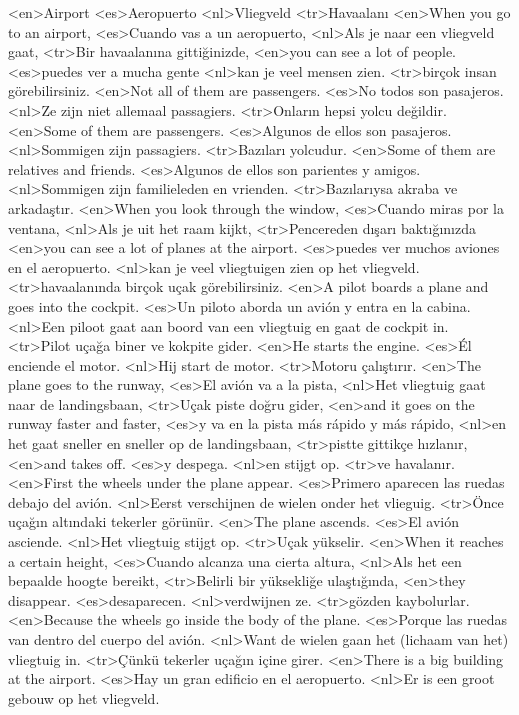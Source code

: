 <en>Airport
<es>Aeropuerto
<nl>Vliegveld 
<tr>Havaalanı
<en>When you go to an airport,
<es>Cuando vas a un aeropuerto,
<nl>Als je naar een vliegveld gaat,
<tr>Bir havaalanına gittiğinizde,
<en>you can see a lot of people.
<es>puedes ver a mucha gente
<nl>kan je veel mensen zien.
<tr>birçok insan görebilirsiniz.
<en>Not all of them are passengers.
<es>No todos son pasajeros.
<nl>Ze zijn niet allemaal passagiers.
<tr>Onların hepsi yolcu değildir.
<en>Some of them are passengers.
<es>Algunos de ellos son pasajeros.
<nl>Sommigen zijn passagiers.
<tr>Bazıları yolcudur.
<en>Some of them are relatives and friends.
<es>Algunos de ellos son parientes y amigos.
<nl>Sommigen zijn familieleden en vrienden.
<tr>Bazılarıysa akraba ve arkadaştır.
<en>When you look through the window,
<es>Cuando miras por la ventana,
<nl>Als je uit het raam kijkt, 
<tr>Pencereden dışarı baktığınızda
<en>you can see a lot of planes at the airport.
<es>puedes ver muchos aviones en el aeropuerto.
<nl>kan je veel vliegtuigen zien op het vliegveld.
<tr>havaalanında birçok uçak görebilirsiniz.
<en>A pilot boards a plane and goes into the cockpit.
<es>Un piloto aborda un avión y entra en la cabina.
<nl>Een piloot gaat aan boord van een vliegtuig en gaat de cockpit in.
<tr>Pilot uçağa biner ve kokpite gider.
<en>He starts the engine.
<es>Él enciende el motor.
<nl>Hij start de motor.
<tr>Motoru çalıştırır.
<en>The plane goes to the runway,
<es>El avión va a la pista,
<nl>Het vliegtuig gaat naar de landingsbaan,
<tr>Uçak piste doğru gider, 
<en>and it goes on the runway faster and faster,
<es>y va en la pista más rápido y más rápido,
<nl>en het gaat sneller en sneller op de landingsbaan,
<tr>pistte gittikçe hızlanır,
<en>and takes off.
<es>y despega.
<nl>en stijgt op.
<tr>ve havalanır.
<en>First the wheels under the plane appear.
<es>Primero aparecen las ruedas debajo del avión.
<nl>Eerst verschijnen de wielen onder het vlieguig.
<tr>Önce uçağın altındaki tekerler görünür.
<en>The plane ascends.
<es>El avión asciende.
<nl>Het vliegtuig stijgt op.
<tr>Uçak yükselir.
<en>When it reaches a certain height,
<es>Cuando alcanza una cierta altura,
<nl>Als het een bepaalde hoogte bereikt, 
<tr>Belirli bir yüksekliğe ulaştığında,
<en>they disappear.
<es>desaparecen.
<nl>verdwijnen ze.
<tr>gözden kaybolurlar.
<en>Because the wheels go inside the body of the plane.
<es>Porque las ruedas van dentro del cuerpo del avión.
<nl>Want de wielen gaan het (lichaam van het) vliegtuig in.
<tr>Çünkü tekerler uçağın içine girer.
<en>There is a big building at the airport.
<es>Hay un gran edificio en el aeropuerto.
<nl>Er is een groot gebouw op het vliegveld.
